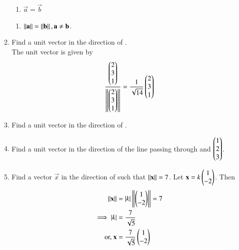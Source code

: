 \begin{enumerate}[label=\arabic*.,ref=\thesubsection.\theenumi]
\begin{enumerate}
\item $\vec{a}=\vec{b}$
\end{enumerate}
%
\solution
\begin{enumerate}
\item $\left\lVert\mathbf{a}\right\rVert=\left\lVert\mathbf{b}\right\rVert,\mathbf{a}\ne\mathbf{b}$.
\end{enumerate}
\item Find a unit vector in the  direction of .
%
\\
\solution The unit vector is given by 
\begin{align}
\frac{\begin{pmatrix}2\\3\\1\end{pmatrix}}{\left\lVert\begin{pmatrix}2\\3\\1\end{pmatrix}\right\rVert} = \frac{1}{\sqrt{14}}\begin{pmatrix}2\\3\\1\end{pmatrix}
\end{align}
%
%
\item Find a unit vector in the direction of .
%
\item Find a unit vector in the direction of the line passing through  and $\begin{pmatrix}1\\2\\3\end{pmatrix}$.
%
\item Find a vector $\vec{x}$ in the direction of  such that $\left\lVert\mathbf{x}\right\rVert = 7$.
%
\solution Let $\mathbf{x} = k\begin{pmatrix}1\\-2\end{pmatrix}$.  Then 
%
\begin{align}
\left\lVert\mathbf{x}\right\rVert &= \left\vert k\right\vert\left\lVert\begin{pmatrix}1\\-2\end{pmatrix}\right\rVert= 7
\\
\implies \left\vert k\right\vert &= \frac{7}{\sqrt{5}}
\\
\text{or, } \mathbf{x} &= \frac{7}{\sqrt{5}}\begin{pmatrix}1\\-2\end{pmatrix}
\end{align}
%


\end{enumerate}
